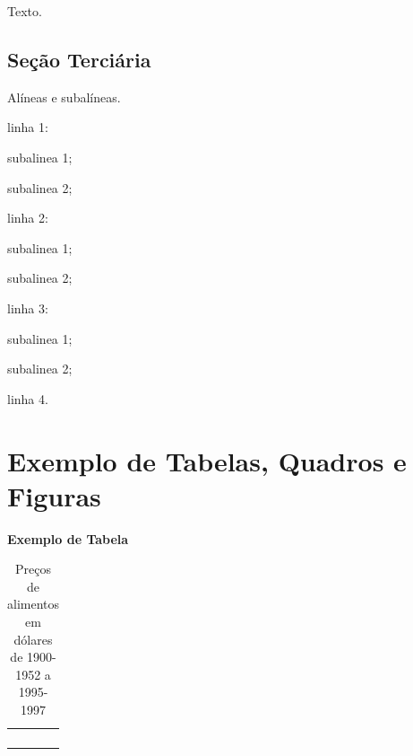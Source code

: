 Texto.

\subsection{Seção Terciária}

Alíneas e subalíneas.
\bigskip

\begin{alineas}
\item linha 1:
\begin{alineas}
\item subalinea 1;
\item subalinea 2;
\end{alineas}
\item linha 2:
\begin{subalineas}
\item subalinea 1;
\item subalinea 2;
\end{subalineas}
\item linha 3:
\begin{incisos}
\item subalinea 1;
\item subalinea 2;
\end{incisos}
\item linha 4.
\end{alineas}


\section{Exemplo de Tabelas, Quadros e Figuras}

{\centering\bfseries\color{red}
Exemplo de Tabela
\par}

\begin{table}[ht]
\centering
\caption{Preços de alimentos em dólares de 1900-1952 a
1995-1997}
\begin{supertabular}{m{3.6cm}m{3.7cm}m{3.6cm}m{3.0cm}}
\hline
{} &
 &
 &
\centering{}\\\hline
{} &
 &
 &
\centering{}\\
 &
 &
 &
\centering{}\\
 &
 &
 &
\centering{}\\
 &
 &
 &
\centering{}\\\hline
\end{supertabular}
    \label{tab:alimentos}
\end{table}

